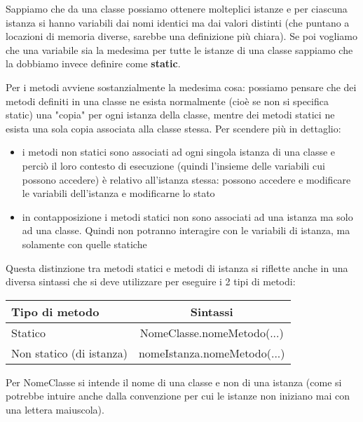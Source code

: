 \documentclass[a4paper,12pt,twoside]{book}
\begin{document}
Sappiamo che da una classe possiamo ottenere molteplici istanze e per
ciascuna istanza si hanno variabili dai nomi identici ma dai valori
distinti (che puntano a locazioni di memoria diverse, sarebbe
una definizione più chiara). Se poi vogliamo che una variabile sia la
medesima per tutte le istanze di una classe sappiamo che la dobbiamo
invece definire come \textbf{static}.

Per i metodi avviene sostanzialmente la medesima cosa: possiamo
pensare che dei metodi definiti in una classe ne esista normalmente
(cioè se non si specifica static) una "copia" per ogni istanza della
classe, mentre dei metodi statici ne esista una sola copia associata
alla classe stessa. Per scendere più in dettaglio:
\begin{itemize}
\item i metodi non statici sono associati ad ogni singola istanza di
  una classe e perciò il loro contesto di esecuzione (quindi l’insieme
  delle variabili cui possono accedere) è relativo all’istanza stessa:
  possono accedere e modificare le variabili dell’istanza e
  modificarne lo stato
\item in contapposizione i metodi statici non sono associati ad una
  istanza ma solo ad una classe. Quindi non potranno interagire con le
  variabili di istanza, ma solamente con quelle statiche
\end{itemize}

Questa distinzione tra metodi statici e metodi di istanza si riflette
anche in una diversa sintassi che si deve utilizzare per eseguire i 2
tipi di metodi:

\begin{table}[ht]
  \centering 
  \begin{tabular}{lc} %
    \hline %
    Tipo di metodo & Sintassi\\
    \hline %
    Statico                 &	NomeClasse.nomeMetodo(...)\\
    Non statico (di istanza)  &	nomeIstanza.nomeMetodo(...)\\
    \hline %
  \end{tabular}
  \label{table:static} %
\end{table}

Per NomeClasse si intende il nome di una classe e non di una istanza
(come si potrebbe intuire anche dalla convenzione per cui le istanze
non iniziano mai con una lettera maiuscola).
\end{document}

